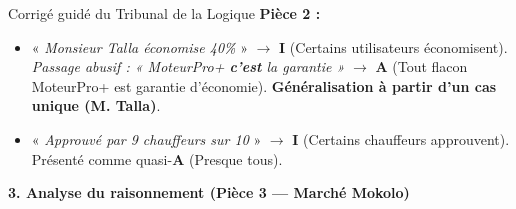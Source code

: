\documentclass[11pt]{article}
\begin{document}
\begin{exoresolu}{Corrigé guidé du Tribunal de la Logique}
\noindent\textbf{Pièce 2 :}
\begin{itemize}
    \item « \emph{Monsieur Talla économise 40\%} » $\rightarrow$ \textbf{I} (Certains utilisateurs économisent). \textit{Passage abusif : « MoteurPro+ \textbf{c'est} la garantie »} $\rightarrow$ \textbf{A} (Tout flacon MoteurPro+ est garantie d'économie). \textbf{Généralisation à partir d'un cas unique (M. Talla)}.
    \item « \emph{Approuvé par 9 chauffeurs sur 10} » $\rightarrow$ \textbf{I} (Certains chauffeurs approuvent). Présenté comme quasi-\textbf{A} (Presque tous).
\end{itemize}

\vspace{0.5em}
\noindent\textbf{3. Analyse du raisonnement (Pièce 3 — Marché Mokolo)}


\end{exoresolu}
\end{document}
